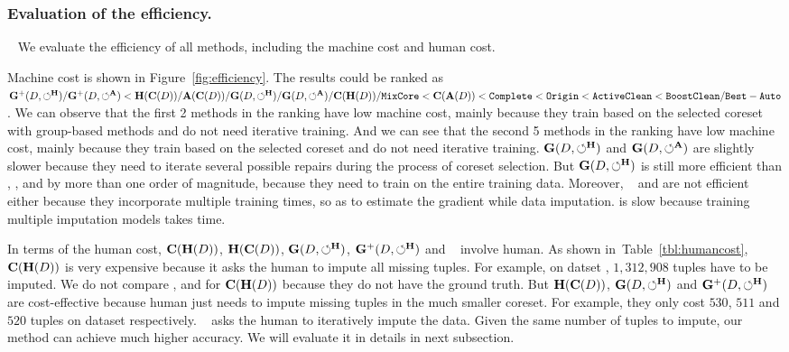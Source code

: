  



\subsubsection{Evaluation of the efficiency.}~\label{sec:exp:efficiency} We  evaluate the efficiency of all methods, including the machine cost and human cost.

 Machine cost is shown  in Figure~\ref{fig:efficiency}.  The results could be ranked as $\mathbf{G}^+(D,\circlearrowleft^\mathbf{H})/\mathbf{G}^+(D,\circlearrowleft^\mathbf{A}) < \mathbf{H}(\mathbf{C}(D))/\mathbf{A}(\mathbf{C}(D))/\mathbf{G}(D,\circlearrowleft^\mathbf{H})/\mathbf{G}(D,\circlearrowleft^\mathbf{A})/\mathbf{C}(\mathbf{H}(D))/{\tt MixCore} < \mathbf{C}(\mathbf{A}(D)) < {\tt Complete} < {\tt Origin} < {\tt ActiveClean} < {\tt BoostClean} /{\tt Best-Auto} $. We can observe that the first 2 methods in the ranking have low machine cost, mainly because they train based on the selected coreset with group-based methods and do not need iterative training. And we can see that the second 5 methods in the ranking have low machine cost, mainly because they train based on the selected coreset and do not need iterative training. $\mathbf{G}(D,\circlearrowleft^\mathbf{H})$ and  $\mathbf{G}(D,\circlearrowleft^\mathbf{A})$ are slightly slower  because they need to iterate several possible repairs during the process of coreset selection.  But $\mathbf{G}(D,\circlearrowleft^\mathbf{H})$ is still more efficient than \noclean, \truth, \boostclean and \gain by more than one order of magnitude,  because they need to train on the entire training data. 
 Moreover, \actclean~  and \boostclean are  not efficient either because they incorporate multiple training times, so as to estimate the gradient while data imputation. \gain is slow because training multiple imputation models takes time.


 In terms of the human cost, $\mathbf{C}(\mathbf{H}(D))$, $\mathbf{H}(\mathbf{C}(D))$, $\mathbf{G}(D,\circlearrowleft^\mathbf{H})$, $\mathbf{G}^+(D,\circlearrowleft^\mathbf{H})$ and  \actclean~ involve human. As shown in~Table~\ref{tbl:humancost}, $\mathbf{C}(\mathbf{H}(D))$ is very expensive because it asks the human to impute all missing tuples. For example, on datset \imdbl, $1,312,908$ tuples have to be imputed. We do not compare \credit, \bike and \air for $\mathbf{C}(\mathbf{H}(D))$ because they do not have the ground truth.
 But $\mathbf{H}(\mathbf{C}(D))$, $\mathbf{G}(D,\circlearrowleft^\mathbf{H})$ and $\mathbf{G}^+(D,\circlearrowleft^\mathbf{H})$ are cost-effective because human just needs to impute missing tuples in the much smaller coreset. For example, they only cost $530$, $511$ and $520$ tuples on dataset \imdbl respectively. 
\actclean~ asks the human to iteratively impute the data. Given the same number of tuples to impute, our method can achieve much higher accuracy. We will  evaluate it in details in next subsection.
 



